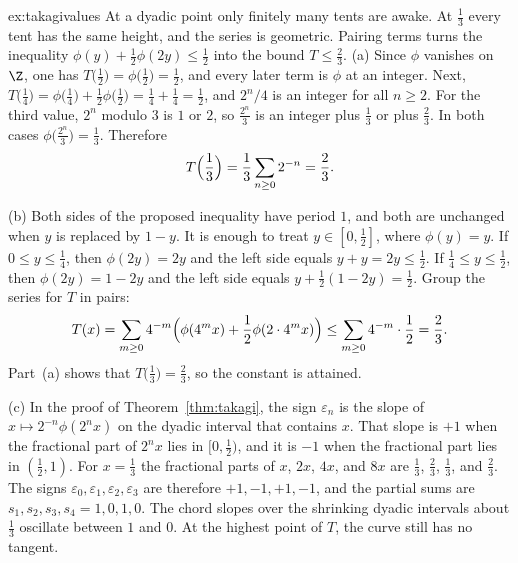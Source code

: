 \begin{solution}{ex:takagivalues}
\idea At a dyadic point only finitely many tents are awake. At $\frac13$ every tent has the same height, and the series is geometric. Pairing terms turns the inequality $\phi(y)+\frac12\phi(2y)\le\frac12$ into the bound $T\le\frac23$.
\writeup (a) Since $\phi$ vanishes on $\Z$, one has $T\bigl(\frac12\bigr)=\phi\bigl(\frac12\bigr)=\frac12$, and every later term is $\phi$ at an integer. Next, $T\bigl(\frac14\bigr)=\phi\bigl(\frac14\bigr)+\frac12\phi\bigl(\frac12\bigr)=\frac14+\frac14=\frac12$, and $2^n/4$ is an integer for all $n\ge2$. For the third value, $2^n$ modulo $3$ is $1$ or $2$, so $\frac{2^n}3$ is an integer plus $\frac13$ or plus $\frac23$. In both cases $\phi\bigl(\frac{2^n}3\bigr)=\frac13$. Therefore
\[T\Bigl(\frac13\Bigr)=\frac13\sum_{n\ge0}2^{-n}=\frac23.\]

(b) Both sides of the proposed inequality have period $1$, and both are unchanged when $y$ is replaced by $1-y$. It is enough to treat $y\in[0,\frac12]$, where $\phi(y)=y$. If $0\le y\le\frac14$, then $\phi(2y)=2y$ and the left side equals $y+y=2y\le\frac12$. If $\frac14\le y\le\frac12$, then $\phi(2y)=1-2y$ and the left side equals $y+\frac12(1-2y)=\frac12$. Group the series for $T$ in pairs:
\[T(x)=\sum_{m\ge0}4^{-m}\Bigl(\phi(4^mx)+\frac12\phi(2\cdot4^mx)\Bigr)\le\sum_{m\ge0}4^{-m}\cdot\frac12=\frac23.\]
Part~(a) shows that $T\bigl(\frac13\bigr)=\frac23$, so the constant is attained.

(c) In the proof of Theorem~\ref{thm:takagi}, the sign $\varepsilon_n$ is the slope of $x\mapsto 2^{-n}\phi(2^nx)$ on the dyadic interval that contains $x$. That slope is $+1$ when the fractional part of $2^nx$ lies in $[0,\frac12)$, and it is $-1$ when the fractional part lies in $(\frac12,1)$. For $x=\frac13$ the fractional parts of $x$, $2x$, $4x$, and $8x$ are $\frac13$, $\frac23$, $\frac13$, and $\frac23$. The signs $\varepsilon_0,\varepsilon_1,\varepsilon_2,\varepsilon_3$ are therefore $+1,-1,+1,-1$, and the partial sums are $s_1,s_2,s_3,s_4=1,0,1,0$. The chord slopes over the shrinking dyadic intervals about $\frac13$ oscillate between $1$ and $0$. At the highest point of $T$, the curve still has no tangent.
\end{solution}

